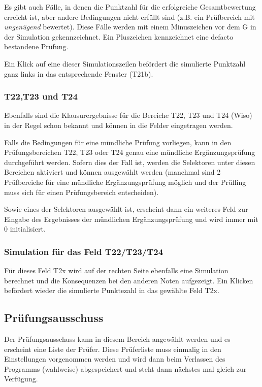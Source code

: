 \documentclass[a4paper,notitlepage,parskip=half]{scrartcl}
\begin{document}
Es gibt auch Fälle, in denen die Punktzahl für die erfolgreiche Gesamtbewertung erreicht ist, aber andere Bedingungen nicht erfüllt sind (z.B. ein Prüfbereich mit \emph{ungenügend} bewertet). Diese Fälle werden mit einem Minuszeichen vor dem G in der Simulation gekennzeichnet. Ein Pluszeichen kennzeichnet eine defacto bestandene Prüfung.

Ein Klick auf eine dieser Simulationszeilen befördert die simulierte Punktzahl ganz links in das entsprechende Fenster (T21b).

\subsubsection*{T22,T23 und T24}
Ebenfalls sind die Klausurergebnisse für die Bereiche T22, T23 und T24 (Wiso) in der Regel schon bekannt und können in die Felder eingetragen werden. 

Falls die Bedingungen für eine mündliche Prüfung vorliegen, kann in den Prüfungsbereichen T22, T23 oder T24 genau eine mündliche Ergänzungsprüfung durchgeführt werden. Sofern dies der Fall ist, werden die Selektoren unter diesen Bereichen aktiviert und können ausgewählt werden (manchmal sind 2 Prüfbereiche für eine mündliche Ergänzungsprüfung möglich und der Prüfling muss sich für einen Prüfungsbereich entscheiden).

Sowie eines der Selektoren ausgewählt ist, erscheint dann ein weiteres Feld zur Eingabe des Ergebnisses der mündlichen Ergänzungsprüfung und wird immer mit 0 initialisiert.

\subsubsection*{Simulation für das Feld T22/T23/T24}
Für dieses Feld T2x wird auf der rechten Seite ebenfalls eine Simulation berechnet und die Konsequenzen bei den anderen Noten aufgezeigt. Ein Klicken befördert wieder die simulierte Punktezahl in das gewählte Feld T2x.

\subsection{Prüfungsausschuss}
Der Prüfungsausschuss kann in diesem Bereich angewählt werden und es erscheint eine Liste der Prüfer.
Diese Prüferliste muss einmalig in den Einstellungen vorgenommen werden und wird dann beim Verlassen des Programms (wahlweise) abgespeichert und steht dann nächstes mal gleich zur Verfügung.
\end{document}
